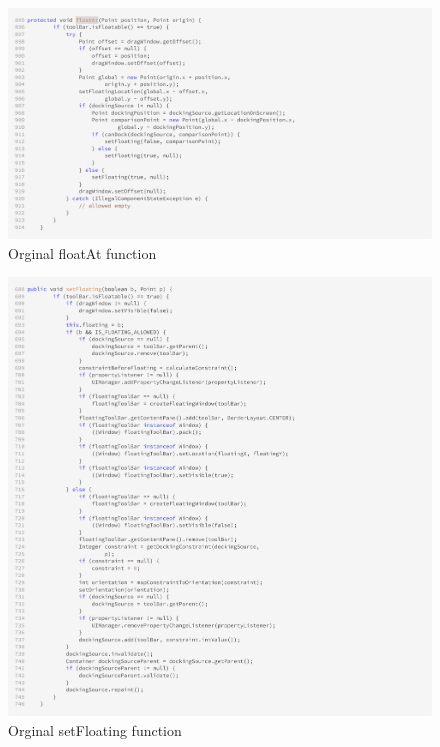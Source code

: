 \begin{figure}[H]
    \centering
    \includegraphics[width=\linewidth]{pic/floatAt.png}
    \caption{Orginal floatAt function}
    \label{fig:Orginal floatAt function}
\end{figure}


\begin{figure}[H]
    \centering
    \includegraphics[width=\linewidth]{pic/setFloating.png}
    \caption{Orginal setFloating function}
    \label{fig:Orginal setFloating function}
\end{figure}

